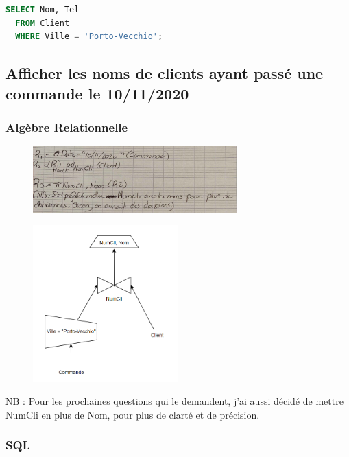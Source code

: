 \documentclass{article}
\begin{document}
\begin{lstlisting}[language=SQL]
  SELECT Nom, Tel 
  FROM Client 
  WHERE Ville = 'Porto-Vecchio';
\end{lstlisting}

\subsection{Afficher les noms de clients ayant passé une commande le 10/11/2020}

\subsubsection{Algèbre Relationnelle}

\begin{figure}[H]
  \centering
  \includegraphics[width=0.7\textwidth]{alg/4.png}
  \label{fig:alg-rel}
\end{figure}

\begin{figure}[H]
  \centering
  \includegraphics[width=0.5\textwidth]{algRel/4.png}
  \label{fig:alg-rel}
\end{figure}


NB : Pour les prochaines questions qui le demandent, j'ai aussi décidé de mettre NumCli en plus de Nom, pour plus de clarté et de précision.

\subsubsection{SQL}
\end{document}
